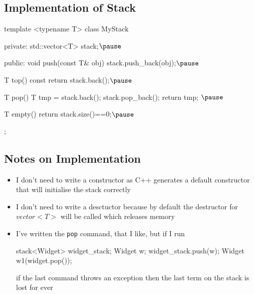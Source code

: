 
\begin{slide}
\section[-1]{Implementation of Stack}

\begin{cpp}
template <typename T>
class MyStack
{
private:
  std::vector<T> stack;$\pause$

public:
  void push(const T& obj) {stack.push_back(obj);}$\pause$

  T top() const {return stack.back();}$\pause$

  T pop() {
    T tmp = stack.back();
    stack.pop_back();
    return tmp;
  }$\pause$

  T empty() {return stack.size()==0;}$\pause$
};
\end{cpp}
\end{slide}


\begin{slide}
\section[-1]{Notes on Implementation}

\begin{PauseHighLight}
  \begin{itemize}
  \item I don't need to write a constructor as C++ generates a default
    constructor that will initialise the stack correctly\pause
  \item I don't need to write a desctuctor because by default the
    destructor for \jl$vector<T>$ will be called which releases
    memory\pause
  \item I've written the \texttt{pop} command, that I like, but if I
    run
    \begin{cpp}
      stack<Widget> widget_stack;
      Widget w;
      widget_stack.push(w);
      Widget w1(widget.pop());
    \end{cpp}
    if the last command throws an exception then the last term on the
    stack is lost for ever\pause
  \end{itemize}
\end{PauseHighLight}

\end{slide}

